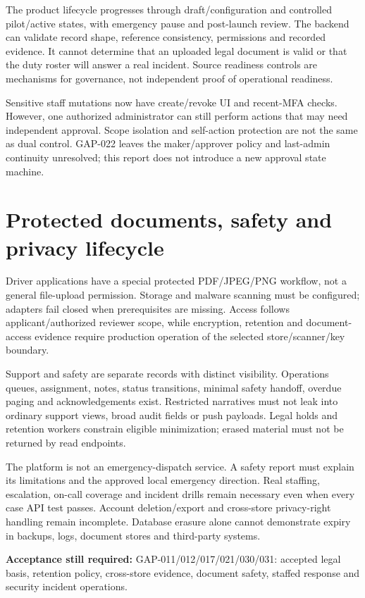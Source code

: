 \documentclass[11pt,a4paper]{article}
\newcommand{\gate}[1]{\par\textbf{Acceptance still required:} #1\par}
\begin{document}
The product lifecycle progresses through draft/configuration and controlled
pilot/active states, with emergency pause and post-launch review. The backend can
validate record shape, reference consistency, permissions and recorded evidence.
It cannot determine that an uploaded legal document is valid or that the duty
roster will answer a real incident. Source readiness controls are mechanisms
for governance, not independent proof of operational readiness.

Sensitive staff mutations now have create/revoke UI and recent-MFA checks.
However, one authorized administrator can still perform actions that may need
independent approval. Scope isolation and self-action protection are not the same
as dual control. GAP-022 leaves the maker/approver policy and last-admin continuity
unresolved; this report does not introduce a new approval state machine.

\section{Protected documents, safety and privacy lifecycle}
Driver applications have a special protected PDF/JPEG/PNG workflow, not a general
file-upload permission. Storage and malware scanning must be configured; adapters
fail closed when prerequisites are missing. Access follows applicant/authorized
reviewer scope, while encryption, retention and document-access evidence require
production operation of the selected store/scanner/key boundary.

Support and safety are separate records with distinct visibility. Operations
queues, assignment, notes, status transitions, minimal safety handoff, overdue
paging and acknowledgements exist. Restricted narratives must not leak into
ordinary support views, broad audit fields or push payloads. Legal holds and
retention workers constrain eligible minimization; erased material must not be
returned by read endpoints.

The platform is not an emergency-dispatch service. A safety report must explain
its limitations and the approved local emergency direction. Real staffing,
escalation, on-call coverage and incident drills remain necessary even when every
case API test passes. Account deletion/export and cross-store privacy-right
handling remain incomplete. Database erasure alone cannot demonstrate expiry in
backups, logs, document stores and third-party systems.
\gate{GAP-011/012/017/021/030/031: accepted legal basis, retention policy,
cross-store evidence, document safety, staffed response and security incident operations.}
\end{document}
